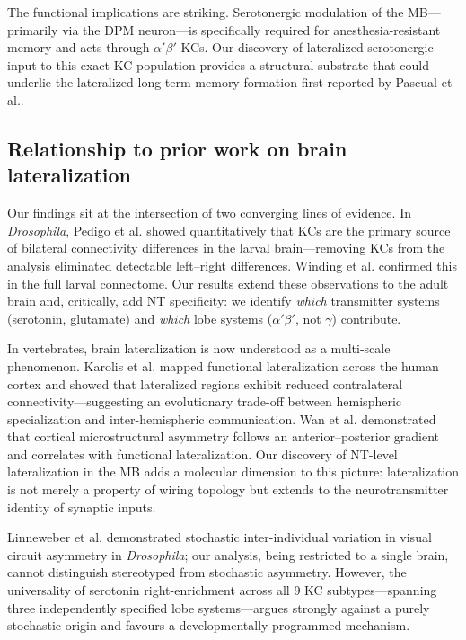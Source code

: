 \documentclass[10pt]{article}
\begin{document}
The functional implications are striking. Serotonergic modulation of the MB---primarily via the DPM neuron\cite{keene2006dpm}---is specifically required for anesthesia-resistant memory and acts through $\alpha'\beta'$ KCs\cite{waddell2013serotonin}. Our discovery of lateralized serotonergic input to this exact KC population provides a structural substrate that could underlie the lateralized long-term memory formation first reported by Pascual et al.\cite{pascual2004lateralized}.

\subsection*{Relationship to prior work on brain lateralization}

Our findings sit at the intersection of two converging lines of evidence. In \textit{Drosophila}, Pedigo et al.\cite{pedigo2023bilateral_elife} showed quantitatively that KCs are the primary source of bilateral connectivity differences in the larval brain---removing KCs from the analysis eliminated detectable left--right differences. Winding et al.\cite{winding2023larva} confirmed this in the full larval connectome. Our results extend these observations to the adult brain and, critically, add NT specificity: we identify \textit{which} transmitter systems (serotonin, glutamate) and \textit{which} lobe systems ($\alpha'\beta'$, not $\gamma$) contribute.

In vertebrates, brain lateralization is now understood as a multi-scale phenomenon. Karolis et al.\cite{karolis2019lateralisation} mapped functional lateralization across the human cortex and showed that lateralized regions exhibit reduced contralateral connectivity---suggesting an evolutionary trade-off between hemispheric specialization and inter-hemispheric communication. Wan et al.\cite{wan2024microstructural} demonstrated that cortical microstructural asymmetry follows an anterior--posterior gradient and correlates with functional lateralization. Our discovery of NT-level lateralization in the MB adds a molecular dimension to this picture: lateralization is not merely a property of wiring topology but extends to the neurotransmitter identity of synaptic inputs.

Linneweber et al.\cite{linneweber2020asymmetry} demonstrated stochastic inter-individual variation in visual circuit asymmetry in \textit{Drosophila}; our analysis, being restricted to a single brain, cannot distinguish stereotyped from stochastic asymmetry. However, the universality of serotonin right-enrichment across all 9 KC subtypes---spanning three independently specified lobe systems---argues strongly against a purely stochastic origin and favours a developmentally programmed mechanism.
\end{document}
